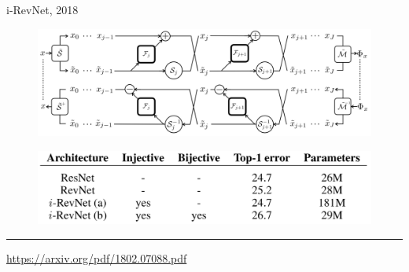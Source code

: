 \documentclass{beamer}
\begin{document}
\begin{frame}{i-RevNet, 2018}
	
	\begin{figure}
		\centering
		\includegraphics[width=\linewidth]{figs/i-revnet.png}
	\end{figure}
	
	\begin{figure}
		\centering
		\includegraphics[width=0.9\linewidth]{figs/i-revnet_block.png}
	\end{figure}
	
	\vfill
	\hrule\medskip
	{\scriptsize \href{https://arxiv.org/pdf/1802.07088.pdf}{https://arxiv.org/pdf/1802.07088.pdf}} 
\end{frame}
\end{document}
